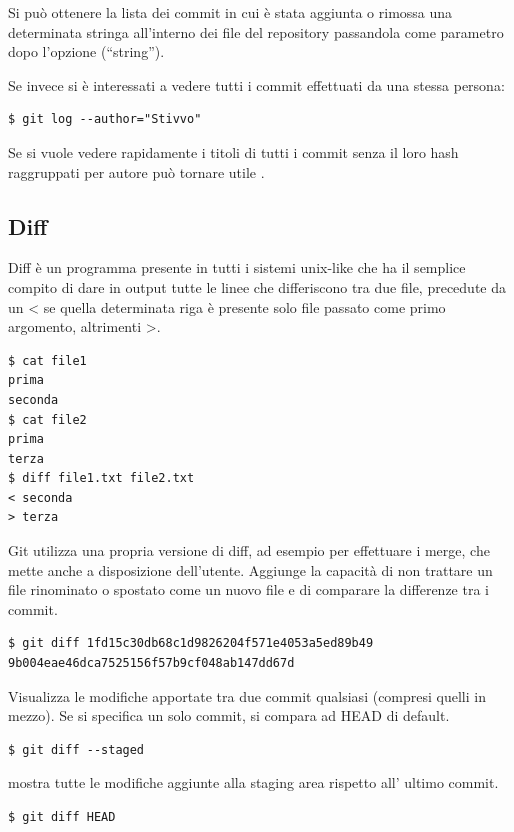 \documentclass{article}
\begin{document}
Si può ottenere la lista dei commit in cui è stata aggiunta o rimossa una
determinata stringa all'interno dei file del repository passandola come
parametro dopo l'opzione  (``string'').

Se invece si è interessati a vedere tutti i commit effettuati da una stessa
persona:

\begin{verbatim}
$ git log --author="Stivvo"
\end{verbatim}

Se si vuole vedere rapidamente i titoli di tutti i commit senza il loro hash 
raggruppati per autore può tornare utile .

\subsection{Diff}
Diff è un programma presente in tutti i sistemi unix-like che ha il semplice
compito di dare in output tutte le linee che differiscono tra due file,
precedute da un < se quella determinata riga è presente solo file passato come
primo argomento, altrimenti >.

\begin{verbatim}
$ cat file1
prima
seconda
$ cat file2
prima
terza
$ diff file1.txt file2.txt
< seconda
> terza
\end{verbatim}

Git utilizza una propria versione di diff, ad esempio per effettuare i merge,
che mette anche a disposizione dell'utente. Aggiunge la capacità di non trattare
un file rinominato o spostato come un nuovo file e di comparare la differenze
tra i commit.

\begin{verbatim}
$ git diff 1fd15c30db68c1d9826204f571e4053a5ed89b49 9b004eae46dca7525156f57b9cf048ab147dd67d
\end{verbatim}

Visualizza le modifiche apportate tra due commit qualsiasi (compresi
quelli in mezzo).
Se si specifica un solo commit, si compara ad HEAD di default.

\begin{verbatim}
$ git diff --staged
\end{verbatim}

 mostra tutte le modifiche aggiunte alla staging area rispetto
all' ultimo commit.

\begin{verbatim}
$ git diff HEAD
\end{verbatim}
\end{document}
